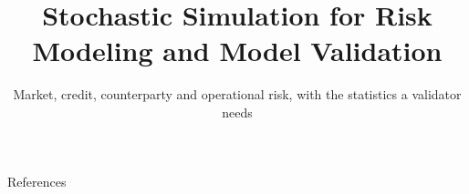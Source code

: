\documentclass[aspectratio=169,10pt]{beamer}
\title{Stochastic Simulation for Risk Modeling and Model Validation}
\subtitle{Market, credit, counterparty and operational risk, with the statistics a validator needs}
\begin{document}
\maketitle











\appendix


\begin{frame}[allowframebreaks]{References}
  \tiny
  \renewcommand{\bibsection}{}
  \nocite{mcneil2015quantitative,glasserman2003monte}
  
  
\end{frame}
\end{document}
